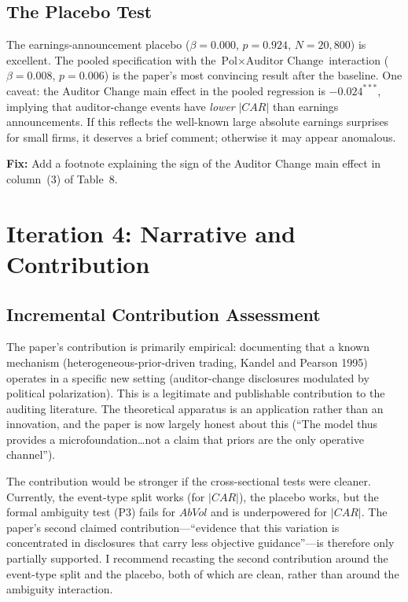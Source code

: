 \documentclass[11pt]{article}
\begin{document}
\subsection{The Placebo Test}

The earnings-announcement placebo ($\beta = 0.000$, $p = 0.924$, $N = 20{,}800$) is excellent. The pooled specification with the $\text{Pol} \times \text{Auditor Change}$ interaction ($\beta = 0.008$, $p = 0.006$) is the paper's most convincing result after the baseline. One caveat: the $\text{Auditor Change}$ main effect in the pooled regression is $-0.024^{***}$, implying that auditor-change events have \emph{lower} $|CAR|$ than earnings announcements. If this reflects the well-known large absolute earnings surprises for small firms, it deserves a brief comment; otherwise it may appear anomalous.

\begin{minorbox}
\textbf{Fix:} Add a footnote explaining the sign of the Auditor Change main effect in column~(3) of Table~8.
\end{minorbox}

\section{Iteration 4: Narrative and Contribution}
\label{sec:narrative}

\subsection{Incremental Contribution Assessment}

The paper's contribution is primarily empirical: documenting that a known mechanism (heterogeneous-prior-driven trading, Kandel and Pearson 1995) operates in a specific new setting (auditor-change disclosures modulated by political polarization). This is a legitimate and publishable contribution to the auditing literature. The theoretical apparatus is an application rather than an innovation, and the paper is now largely honest about this (``The model thus provides a microfoundation\ldots not a claim that priors are the only operative channel'').

The contribution would be stronger if the cross-sectional tests were cleaner. Currently, the event-type split works (for $|CAR|$), the placebo works, but the formal ambiguity test (P3) fails for $AbVol$ and is underpowered for $|CAR|$. The paper's second claimed contribution---``evidence that this variation is concentrated in disclosures that carry less objective guidance''---is therefore only partially supported. I recommend recasting the second contribution around the event-type split and the placebo, both of which are clean, rather than around the ambiguity interaction.
\end{document}
